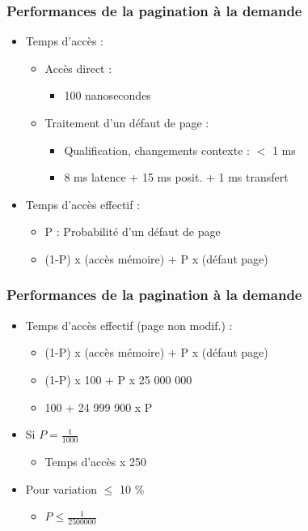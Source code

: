 \begin{frame}
\frametitle{Performances de la pagination à la demande}
\begin{itemize}
\item Temps d'accès :
\begin{itemize}
\item Accès direct :
\begin{itemize}
\item 100 nanosecondes
\end{itemize}
\item Traitement d'un défaut de page :
\begin{itemize}
\item Qualification, changements contexte : $<$ 1 ms
\item 8 ms latence + 15 ms posit. + 1 ms transfert
\end{itemize}
\end{itemize}
\item Temps d'accès effectif :
\begin{itemize}
\item P : Probabilité d'un défaut de page
\item (1-P) x (accès mémoire) + P x (défaut page)
\end{itemize}
\end{itemize}
\end{frame}


\begin{frame}
\frametitle{Performances de la pagination à la demande}
\begin{itemize}
\item Temps d’accès effectif (page non modif.) :
\begin{itemize}
\item (1-P) x (accès mémoire) + P x (défaut page)
\item (1-P) x 100 + P x 25 000 000
\item 100 + 24 999 900 x P
\end{itemize}
\item Si $P = \frac{1}{1000}$
\begin{itemize}
\item Temps d'accès x 250
\end{itemize}
\item Pour variation $\le$ 10 \%
\begin{itemize}
\item $P \le \frac{1}{2500000}$
\end{itemize}
\end{itemize}
\end{frame}


